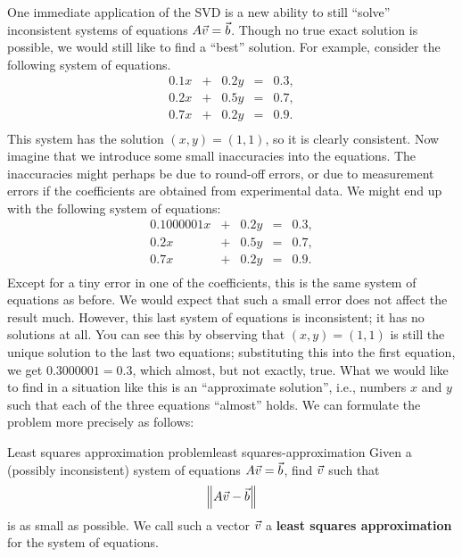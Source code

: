 \documentclass{ximera}
\begin{document}
One immediate application of the SVD is a new ability to still ``solve'' inconsistent systems of equations $A\vec{v}=\vec{b}$. Though no true exact solution is possible, we would still like
to find a ``best'' solution. For example, consider the following system
of equations.
\begin{equation*}
  \begin{array}{rcrcl}
    0.1 x &+& 0.2 y &=& 0.3, \\
    0.2 x &+& 0.5 y &=& 0.7, \\
    0.7 x &+& 0.2 y &=& 0.9. \\
  \end{array}
\end{equation*}
This system has the solution $(x,y)=(1,1)$, so it is clearly
consistent. Now imagine that we introduce some small inaccuracies into
the equations. The inaccuracies might perhaps be due to round-off
errors, or due to measurement errors if the coefficients are obtained
from experimental data. We might end up with the following system of
equations:
\begin{equation*}
  \begin{array}{rcrcl}
    0.1000001 x &+& 0.2 y &=& 0.3, \\
    0.2 x &+& 0.5 y &=& 0.7, \\
    0.7 x &+& 0.2 y &=& 0.9. \\
  \end{array}
\end{equation*}
Except for a tiny error in one of the coefficients, this is the same
system of equations as before. We would expect that such a small error
does not affect the result much. However, this last system of
equations is inconsistent; it has no solutions at all. You can see
this by observing that $(x,y)=(1,1)$ is still the unique solution to
the last two equations; substituting this into the first equation, we
get $0.3000001 = 0.3$, which almost, but not exactly, true. What we
would like to find in a situation like this is an ``approximate
solution'', i.e., numbers $x$ and $y$ such that each of the three
equations ``almost'' holds. We can formulate the problem more
precisely as follows:

\begin{problem}{Least squares approximation problem}{least squares-approximation}
  Given a (possibly inconsistent) system of equations
  $A\vec{v}=\vec{b}$, find $\vec{v}$ such that
  \begin{equation*}
    \left\|A\vec{v} - \vec{b}\right\|
  \end{equation*}
  is as small as possible. We call such a vector $\vec{v}$ a
  \textbf{least squares approximation}%
   for the system of equations.
\end{problem}
\end{document}
